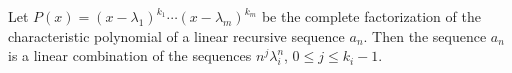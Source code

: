 

\setcounter{section}{1}
\setcounter{subsection}{3}
\setcounter{dfn}{6}

\begin{thm}
Let $P(x) = (x-\lambda_1)^{k_1} \cdots (x-\lambda_m)^{k_m}$ be the complete factorization of the characteristic polynomial
of a linear recursive sequence $a_n$.
Then the sequence $a_n$ is a linear combination of the sequences $n^j \lambda_i^n$, $0 \le j \le k_i - 1$.
\end{thm}


